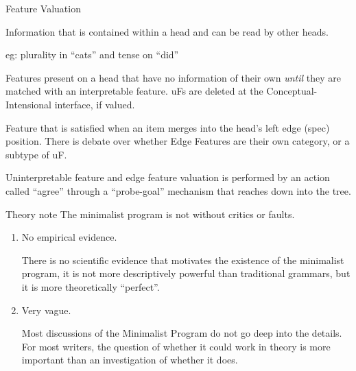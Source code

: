 \documentclass[10pt]{beamer}
\begin{document}
\begin{frame}[fragile]{Feature Valuation}
  \begin{description}
    \item[Interpretable Features] Information that is contained within a head and can be read by other heads. 
      
      eg: plurality in ``cats'' and tense on ``did''
    \item[Uninterpretable Features] Features present on a head that have no information of their own \emph{until} they are matched with an interpretable feature. uFs are deleted at the Conceptual-Intensional interface, if valued. 

    \item[Edge Features] Feature that is satisfied when an item merges into the head's left edge (spec) position. There is debate over whether Edge Features are their own category, or a subtype of uF. 
  \end{description}
  Uninterpretable feature and edge feature valuation is performed by an action called ``agree'' through a ``probe-goal'' mechanism that reaches down into the tree.
\end{frame}




\begin{frame}[fragile]{Theory note}
  The minimalist program is not without critics or faults.
  \pause
  
  \begin{enumerate}[<+->]
    \item No empirical evidence.

    There is no scientific evidence that motivates the existence of the minimalist program, it is not more descriptively powerful than traditional grammars, but it is more theoretically ``perfect''.
    \item Very vague.

    Most discussions of the Minimalist Program do not go deep into the details. For most writers, the question of whether it could work in theory is more important than an investigation of whether it does. 
  \end{enumerate}


\end{frame}


\end{document}
